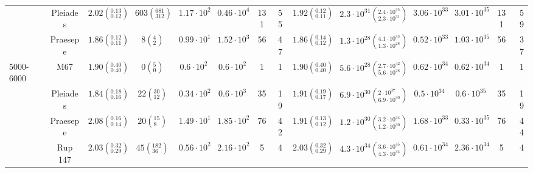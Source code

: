 \begin{tabular}{lccccccccccccr}
          & Pleiades &  $2.02\left(^{0.13}_{0.12}\right)$ &      $603\left(^{681}_{312}\right)$ &    $1.17\cdot 10^{2}$ &    $0.46\cdot 10^{4}$ &                 131 &                  55 &  $1.92\left(^{0.12}_{0.11}\right)$ &  $2.3 \cdot 10^{31}\left(^{2.4 \cdot 10^{35}}_{2.3 \cdot 10^{31}}\right)$ &       $3.06\cdot 10^{33}$ &       $3.01\cdot 10^{35}$ &                   131 &                    59 \\
          & Praesepe &  $1.86\left(^{0.12}_{0.11}\right)$ &            $8\left(^{4}_{2}\right)$ &    $0.99\cdot 10^{1}$ &    $1.52\cdot 10^{3}$ &                  56 &                  47 &  $1.86\left(^{0.14}_{0.12}\right)$ &  $1.3 \cdot 10^{28}\left(^{4.1 \cdot 10^{32}}_{1.3 \cdot 10^{28}}\right)$ &       $0.52\cdot 10^{33}$ &       $1.03\cdot 10^{35}$ &                    56 &                    37 \\
5000-6000 & M67 &  $1.90\left(^{0.40}_{0.40}\right)$ &            $0\left(^{5}_{0}\right)$ &     $0.6\cdot 10^{2}$ &     $0.6\cdot 10^{2}$ &                   1 &                   1 &  $1.90\left(^{0.40}_{0.40}\right)$ &  $5.6 \cdot 10^{28}\left(^{2.7 \cdot 10^{42}}_{5.6 \cdot 10^{28}}\right)$ &       $0.62\cdot 10^{34}$ &       $0.62\cdot 10^{34}$ &                     1 &                     1 \\
          & Pleiades &  $1.84\left(^{0.18}_{0.16}\right)$ &         $22\left(^{30}_{12}\right)$ &    $0.34\cdot 10^{2}$ &     $0.6\cdot 10^{3}$ &                  35 &                  19 &  $1.91\left(^{0.19}_{0.17}\right)$ &    $6.9 \cdot 10^{30}\left(^{2 \cdot 10^{37}}_{6.9 \cdot 10^{30}}\right)$ &        $0.5\cdot 10^{34}$ &        $0.6\cdot 10^{35}$ &                    35 &                    19 \\
          & Praesepe &  $2.08\left(^{0.16}_{0.14}\right)$ &          $20\left(^{15}_{8}\right)$ &    $1.49\cdot 10^{1}$ &    $1.85\cdot 10^{2}$ &                  76 &                  42 &  $1.91\left(^{0.13}_{0.12}\right)$ &  $1.2 \cdot 10^{30}\left(^{3.2 \cdot 10^{34}}_{1.2 \cdot 10^{30}}\right)$ &       $1.68\cdot 10^{33}$ &       $0.33\cdot 10^{35}$ &                    76 &                    44 \\
          & Rup 147 &  $2.03\left(^{0.32}_{0.29}\right)$ &        $45\left(^{182}_{36}\right)$ &    $0.56\cdot 10^{2}$ &    $2.16\cdot 10^{2}$ &                   5 &                   4 &  $2.03\left(^{0.32}_{0.29}\right)$ &  $4.3 \cdot 10^{34}\left(^{3.6 \cdot 10^{45}}_{4.3 \cdot 10^{34}}\right)$ &       $0.61\cdot 10^{34}$ &       $2.36\cdot 10^{34}$ &                     5 &                     4 \\
\hline

\end{tabular}
